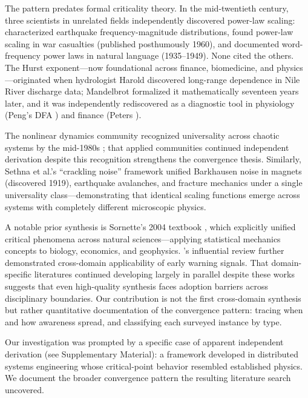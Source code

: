 \documentclass[11pt]{article}
\begin{document}
The pattern predates formal criticality theory. In the mid-twentieth century, three scientists in unrelated fields independently discovered power-law scaling: \citet{gutenberg1944} characterized earthquake frequency-magnitude distributions, \citet{richardson1960} found power-law scaling in war casualties (published posthumously 1960), and \citet{zipf1949} documented word-frequency power laws in natural language (1935--1949). None cited the others. The Hurst exponent---now foundational across finance, biomedicine, and physics---originated when hydrologist Harold \citet{hurst1951} discovered long-range dependence in Nile River discharge data; Mandelbrot formalized it mathematically seventeen years later, and it was independently rediscovered as a diagnostic tool in physiology (Peng's DFA \citep{peng1994dna}) and finance (Peters \citep{peters1994}).

The nonlinear dynamics community recognized universality across chaotic systems by the mid-1980s \citep{cvitanovic1984}; that applied communities continued independent derivation despite this recognition strengthens the convergence thesis. Similarly, Sethna et al.'s ``crackling noise'' framework \citep{sethna2001} unified Barkhausen noise in magnets (discovered 1919), earthquake avalanches, and fracture mechanics under a single universality class---demonstrating that identical scaling functions emerge across systems with completely different microscopic physics.

A notable prior synthesis is Sornette's 2004 textbook \citep{sornette2004}, which explicitly unified critical phenomena across natural sciences---applying statistical mechanics concepts to biology, economics, and geophysics. \citeauthor{scheffer2009}'s influential review \citep{scheffer2009} further demonstrated cross-domain applicability of early warning signals. That domain-specific literatures continued developing largely in parallel despite these works suggests that even high-quality synthesis faces adoption barriers across disciplinary boundaries. Our contribution is not the first cross-domain synthesis but rather quantitative documentation of the convergence pattern: tracing when and how awareness spread, and classifying each surveyed instance by type.

Our investigation was prompted by a specific case of apparent independent derivation (see Supplementary Material): a framework developed in distributed systems engineering whose critical-point behavior resembled established physics. We document the broader convergence pattern the resulting literature search uncovered.
\end{document}
